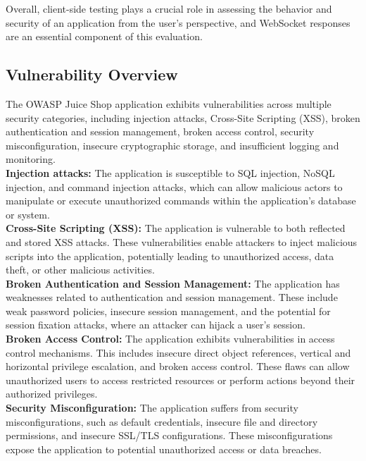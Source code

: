\documentclass[12pt]{article}
\begin{document}
Overall, client-side testing plays a crucial role in assessing the behavior and security of an application from the user's perspective, and WebSocket responses are an essential component of this evaluation.\\

\newpage
\subsection{Vulnerability Overview}
The OWASP Juice Shop application exhibits vulnerabilities across multiple security categories, including injection attacks, Cross-Site Scripting (XSS), broken authentication and session management, broken access control, security misconfiguration, insecure cryptographic storage, and insufficient logging and monitoring.\\

\textbf{Injection attacks:} The application is susceptible to SQL injection, NoSQL injection, and command injection attacks, which can allow malicious actors to manipulate or execute unauthorized commands within the application's database or system.\\

\textbf{Cross-Site Scripting (XSS):} The application is vulnerable to both reflected and stored XSS attacks. These vulnerabilities enable attackers to inject malicious scripts into the application, potentially leading to unauthorized access, data theft, or other malicious activities.\\

\textbf{Broken Authentication and Session Management:} The application has weaknesses related to authentication and session management. These include weak password policies, insecure session management, and the potential for session fixation attacks, where an attacker can hijack a user's session.\\

\textbf{Broken Access Control:} The application exhibits vulnerabilities in access control mechanisms. This includes insecure direct object references, vertical and horizontal privilege escalation, and broken access control. These flaws can allow unauthorized users to access restricted resources or perform actions beyond their authorized privileges.\\

\textbf{Security Misconfiguration:} The application suffers from security misconfigurations, such as default credentials, insecure file and directory permissions, and insecure SSL/TLS configurations. These misconfigurations expose the application to potential unauthorized access or data breaches.\\
\end{document}
